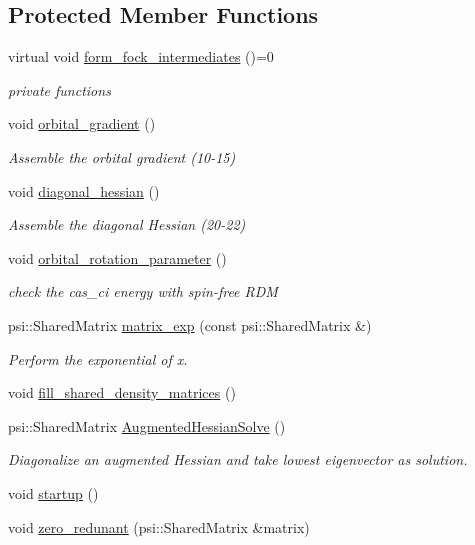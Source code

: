 \subsection*{Protected Member Functions}
\begin{DoxyCompactItemize}
\item 
virtual void \mbox{\hyperlink{classforte_1_1_orbital_optimizer_a220ce17cb9737398ce72e1ebb0cc6deb}{form\+\_\+fock\+\_\+intermediates}} ()=0
\begin{DoxyCompactList}\small\item\em private functions \end{DoxyCompactList}\item 
void \mbox{\hyperlink{classforte_1_1_orbital_optimizer_a756bc6851ab69b75af50988df8e3c09b}{orbital\+\_\+gradient}} ()
\begin{DoxyCompactList}\small\item\em Assemble the orbital gradient (10-\/15) \end{DoxyCompactList}\item 
void \mbox{\hyperlink{classforte_1_1_orbital_optimizer_a160f10316ab646946b81b29588c15dd9}{diagonal\+\_\+hessian}} ()
\begin{DoxyCompactList}\small\item\em Assemble the diagonal Hessian (20-\/22) \end{DoxyCompactList}\item 
void \mbox{\hyperlink{classforte_1_1_orbital_optimizer_ab203be9923d38cc32fcc14dde9c7ee6e}{orbital\+\_\+rotation\+\_\+parameter}} ()
\begin{DoxyCompactList}\small\item\em check the cas\+\_\+ci energy with spin-\/free R\+DM \end{DoxyCompactList}\item 
psi\+::\+Shared\+Matrix \mbox{\hyperlink{classforte_1_1_orbital_optimizer_ab23e7cd3a3fb5cf248d6746dfba9aa63}{matrix\+\_\+exp}} (const psi\+::\+Shared\+Matrix \&)
\begin{DoxyCompactList}\small\item\em Perform the exponential of x. \end{DoxyCompactList}\item 
void \mbox{\hyperlink{classforte_1_1_orbital_optimizer_ab664d52eae4da6b098d40367083c75d2}{fill\+\_\+shared\+\_\+density\+\_\+matrices}} ()
\item 
psi\+::\+Shared\+Matrix \mbox{\hyperlink{classforte_1_1_orbital_optimizer_af3aa08d3914c100e2ac1ac738d462881}{Augmented\+Hessian\+Solve}} ()
\begin{DoxyCompactList}\small\item\em Diagonalize an augmented Hessian and take lowest eigenvector as solution. \end{DoxyCompactList}\item 
void \mbox{\hyperlink{classforte_1_1_orbital_optimizer_afb772d5dd6c157b0c210c7bbd20c0e81}{startup}} ()
\item 
void \mbox{\hyperlink{classforte_1_1_orbital_optimizer_a7f79e499361da4bc0d4b90187033d38f}{zero\+\_\+redunant}} (psi\+::\+Shared\+Matrix \&matrix)
\end{DoxyCompactItemize}
